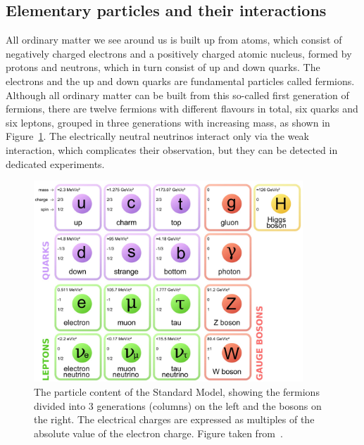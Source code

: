 \subsection{Elementary particles and their interactions}

All ordinary matter we see around us is built up from atoms, which consist of negatively charged electrons and a positively charged atomic nucleus, formed by protons and neutrons, which in turn consist of up and down quarks. The electrons and the up and down quarks are fundamental particles called fermions. Although all ordinary matter can be built from this so-called first generation of fermions, there are twelve fermions with different flavours in total, six quarks and six leptons, grouped in three generations with increasing mass, as shown in Figure~\ref{fig:SM}. The electrically neutral neutrinos interact only via the weak interaction, which complicates their observation, but they can be detected in dedicated experiments.

\begin{figure}[ht]
  \centering
  \includegraphics[width=0.9\textwidth]{SM.jpg}\hfill%
  \caption{The particle content of the Standard Model, showing the fermions divided into 3 generations (columns) on the left and the bosons on the right. The electrical charges are expressed as multiples of the absolute value of the electron charge. Figure taken from~\cite{quantumdiaries}.}
  \label{fig:SM}
\end{figure}


